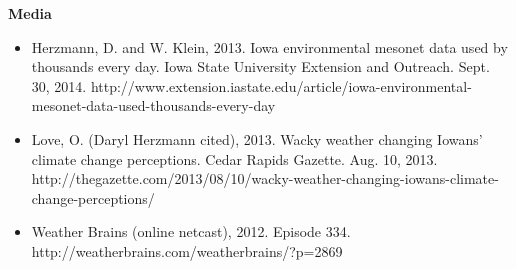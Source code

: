 \normalsize \sf
\normalsize \bf Media
\normalsize \sf
\begin{itemize}
\item Herzmann, D. and W. Klein, 2013. Iowa environmental mesonet data used by thousands every day. Iowa State University Extension and Outreach. Sept. 30, 2014. http://www.extension.iastate.edu/article/iowa-environmental-mesonet-data-used-thousands-every-day
\item Love, O. (Daryl Herzmann cited), 2013. Wacky weather changing Iowans’ climate change perceptions. Cedar Rapids Gazette. Aug. 10, 2013. http://thegazette.com/2013/08/10/wacky-weather-changing-iowans-climate-change-perceptions/
\item Weather Brains (online netcast), 2012. Episode 334. http://weatherbrains.com/weatherbrains/?p=2869
\end{itemize}


\pagebreak

